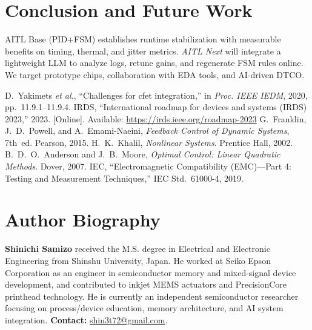 \documentclass[conference]{IEEEtran}
\begin{document}
\section{Conclusion and Future Work}
AITL Base (PID+FSM) establishes runtime stabilization with measurable benefits on timing, thermal, and jitter metrics. \emph{AITL Next} will integrate a lightweight LLM to analyze logs, retune gains, and regenerate FSM rules online. We target prototype chips, collaboration with EDA tools, and AI-driven DTCO.

\begin{thebibliography}{6}
 D.~Yakimets \emph{et al.}, ``Challenges for cfet integration,'' in \emph{Proc. IEEE IEDM}, 2020, pp.~11.9.1--11.9.4.
 IRDS, ``International roadmap for devices and systems (IRDS) 2023,'' 2023. [Online]. Available: \url{https://irds.ieee.org/roadmap-2023}
 G.~Franklin, J.~D.~Powell, and A.~Emami-Naeini, \emph{Feedback Control of Dynamic Systems}, 7th~ed. Pearson, 2015.
 H.~K.~Khalil, \emph{Nonlinear Systems}. Prentice Hall, 2002.
 B.~D.~O.~Anderson and J.~B.~Moore, \emph{Optimal Control: Linear Quadratic Methods}. Dover, 2007.
 IEC, ``Electromagnetic Compatibility (EMC)---Part 4: Testing and Measurement Techniques,'' IEC Std.~61000-4, 2019.
\end{thebibliography}

\section*{Author Biography}
\textbf{Shinichi Samizo} received the M.S. degree in Electrical and Electronic Engineering from Shinshu University, Japan. He worked at Seiko Epson Corporation as an engineer in semiconductor memory and mixed-signal device development, and contributed to inkjet MEMS actuators and PrecisionCore printhead technology. He is currently an independent semiconductor researcher focusing on process/device education, memory architecture, and AI system integration. \textbf{Contact:} \href{mailto:shin3t72@gmail.com}{shin3t72@gmail.com}.
\end{document}
